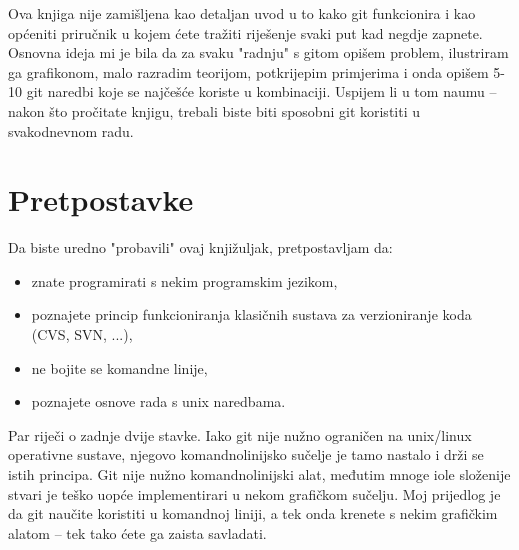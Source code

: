 Ova knjiga nije zamišljena kao detaljan uvod u to kako git funkcionira i kao općeniti priručnik u kojem ćete tražiti riješenje svaki put kad negdje zapnete.
Osnovna ideja mi je bila da za svaku "radnju" s gitom opišem problem, ilustriram ga grafikonom, malo razradim teorijom, potkrijepim primjerima i onda opišem 5-10 git naredbi koje se najčešće koriste u kombinaciji. 
Uspijem li u tom naumu -- nakon što pročitate knjigu, trebali biste biti sposobni git koristiti u svakodnevnom radu. 

\section*{Pretpostavke}

Da biste uredno "probavili" ovaj knjižuljak, pretpostavljam da:

\begin{itemize}
	\item znate programirati s nekim programskim jezikom,
	\item poznajete princip funkcioniranja klasičnih sustava za verzioniranje koda (CVS, SVN, ...),
	\item ne bojite se komandne linije,
	\item poznajete osnove rada s unix naredbama.
\end{itemize}

Par riječi o zadnje dvije stavke.
Iako git nije nužno ograničen na unix/linux operativne sustave, njegovo komandnolinijsko sučelje je tamo nastalo i drži se istih principa.
Git nije nužno komandnolinijski alat, međutim mnoge iole složenije stvari je teško uopće implementirari u nekom grafičkom sučelju. 
Moj prijedlog je da git naučite koristiti u komandnoj liniji, a tek onda krenete s nekim grafičkim alatom -- tek tako ćete ga zaista savladati.

